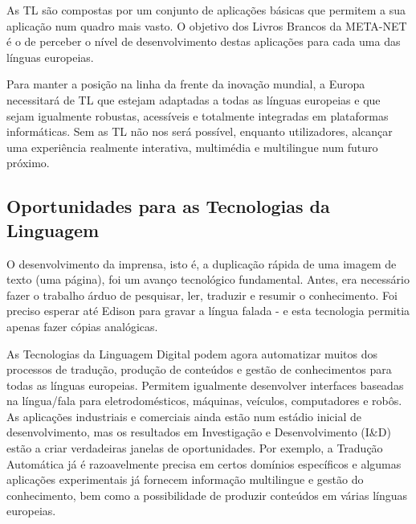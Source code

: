 \documentclass[]{../metanetpaper}
\begin{document}
\begin{multicols}{2}
As TL são compostas por um conjunto de aplicações básicas que permitem a sua aplicação num quadro mais vasto. O objetivo dos Livros Brancos da META-NET é o de perceber o nível de desenvolvimento destas aplicações para cada uma das línguas europeias.


Para manter a posição na linha da frente da inovação mundial, a Europa necessitará de TL que estejam adaptadas a todas as línguas europeias e que sejam igualmente robustas, acessíveis e totalmente integradas em plataformas informáticas. Sem as TL não nos será possível, enquanto utilizadores, alcançar uma experiência realmente interativa, multimédia e multilingue num futuro próximo.

\subsection{Oportunidades para as Tecnologias da Linguagem}

O desenvolvimento da imprensa, isto é, a duplicação rápida de uma imagem de texto (uma página), foi um avanço tecnológico fundamental. Antes, era necessário fazer o trabalho árduo de pesquisar, ler, traduzir e resumir o conhecimento. Foi preciso esperar até Edison para gravar a língua falada - e esta tecnologia permitia apenas fazer cópias analógicas.

As Tecnologias da Linguagem Digital podem agora automatizar muitos dos processos de tradução, produção de conteúdos e gestão de conhecimentos para todas as línguas europeias. Permitem igualmente desenvolver interfaces baseadas na língua/fala para eletrodomésticos, máquinas, veículos, computadores e robôs. As aplicações industriais e comerciais ainda estão num estádio inicial de desenvolvimento, mas os resultados em Investigação e Desenvolvimento (I\&D) estão a criar verdadeiras janelas de oportunidades. Por exemplo, a Tradução Automática já é razoavelmente precisa em certos domínios específicos e algumas aplicações experimentais já fornecem informação multilingue e gestão do conhecimento, bem como a possibilidade de produzir conteúdos em várias línguas europeias.


\end{multicols}
\end{document}
